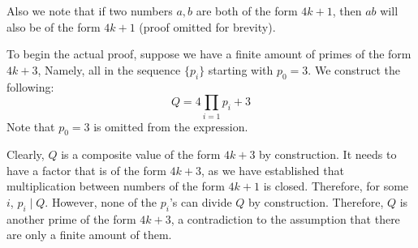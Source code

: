 \documentclass{article}
\begin{document}
\begin{multicols*}{2}
Also we note that if two numbers $a, b$ are both of the form $4k +1$, then $ab$ will also be of the form $4k + 1$ (proof omitted for brevity).

To begin the actual proof, suppose we have a finite amount of primes of the form $4k+3$, Namely, all in the sequence $\{p_i\}$ starting with $p_0 = 3$. We construct the following: \[Q = 4\prod_{i=1}{p_i} + 3\]Note that $p_0 = 3$ is omitted from the expression.

Clearly, $Q$ is a composite value of the form $4k+3$ by construction. It needs to have a factor that is of the form $4k+3$, as we have established that multiplication between numbers of the form $4k+1$ is closed. Therefore, for some $i$, $p_i \mid Q$. However, none of the $p_i$'s can divide $Q$ by construction. Therefore, $Q$ is another prime of the form $4k+3$, a contradiction to the assumption that there are only a finite amount of them.

\end{multicols*}
\end{document}
